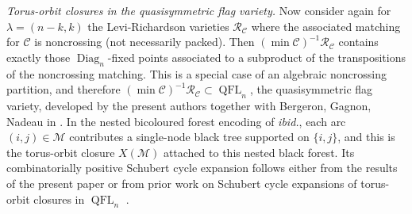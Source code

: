 \documentclass[11pt]{amsart}
\theoremstyle{definition}
\numberwithin{equation}{section}
\begin{document}
\smallskip
\noindent\textit{Torus-orbit closures in the quasisymmetric flag variety.}
    Now consider again for $\lambda=(n-k,k)$ the Levi-Richardson varieties $\mathcal{R}_{\mathcal{C}}$ where the associated matching for $\mathcal{C}$ is noncrossing (not necessarily packed). Then $(\min \mathcal{C})^{-1}\mathcal{R}_{\mathcal{C}}$ contains exactly those $\operatorname{Diag}_n$-fixed points associated to a subproduct of the transpositions of the noncrossing matching. This is a special case of an algebraic noncrossing partition, and therefore $(\min \mathcal{C})^{-1}\mathcal{R}_{\mathcal{C}}\subset \operatorname{QFL}_n$, the quasisymmetric flag variety, developed by the present authors together with Bergeron, Gagnon, Nadeau in \cite{BGNST2}.
    In the nested bicoloured forest encoding of \textit{ibid.}, each arc $(i,j)\in\mathcal{M}$
contributes a single-node black tree supported on $\{i,j\}$, and this is the torus-orbit
closure $X(\mathcal{M})$ attached to this nested black forest. Its
combinatorially positive Schubert cycle expansion follows either from the results of the
present paper or from prior work on Schubert cycle expansions of torus-orbit closures in
$\operatorname{QFL}_n$ \cite{NST_c,BGNST2}.




\end{document}
